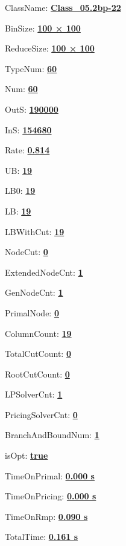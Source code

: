 \documentclass[11pt]{article}
\begin{document}
\pagestyle{empty}


ClassName: \underline{\textbf{Class_05.2bp-22}}
\par
BinSize: \underline{\textbf{100 × 100}}
\par
ReduceSize: \underline{\textbf{100 × 100}}
\par
TypeNum: \underline{\textbf{60}}
\par
Num: \underline{\textbf{60}}
\par
OutS: \underline{\textbf{190000}}
\par
InS: \underline{\textbf{154680}}
\par
Rate: \underline{\textbf{0.814}}
\par
UB: \underline{\textbf{19}}
\par
LB0: \underline{\textbf{19}}
\par
LB: \underline{\textbf{19}}
\par
LBWithCut: \underline{\textbf{19}}
\par
NodeCut: \underline{\textbf{0}}
\par
ExtendedNodeCnt: \underline{\textbf{1}}
\par
GenNodeCnt: \underline{\textbf{1}}
\par
PrimalNode: \underline{\textbf{0}}
\par
ColumnCount: \underline{\textbf{19}}
\par
TotalCutCount: \underline{\textbf{0}}
\par
RootCutCount: \underline{\textbf{0}}
\par
LPSolverCnt: \underline{\textbf{1}}
\par
PricingSolverCnt: \underline{\textbf{0}}
\par
BranchAndBoundNum: \underline{\textbf{1}}
\par
isOpt: \underline{\textbf{true}}
\par
TimeOnPrimal: \underline{\textbf{0.000 s}}
\par
TimeOnPricing: \underline{\textbf{0.000 s}}
\par
TimeOnRmp: \underline{\textbf{0.090 s}}
\par
TotalTime: \underline{\textbf{0.161 s}}
\par
\newpage


\end{document}
